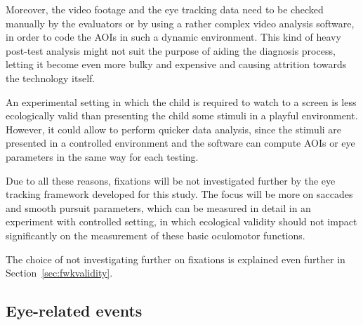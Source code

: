 Moreover, the video footage and the eye tracking data need to be checked manually by the evaluators or by using a rather complex video analysis software, in order to code the AOIs in such a dynamic environment. This kind of heavy post-test analysis might not suit the purpose of aiding the diagnosis process, letting it become even more bulky and expensive and causing attrition towards the technology itself.

An experimental setting in which the child is required to watch to a screen is less ecologically valid than presenting the child some stimuli in a playful environment. However, it could allow to perform quicker data analysis, since the stimuli are presented in a controlled environment and the software can compute AOIs or eye parameters in the same way for each testing.

Due to all these reasons, fixations will be not investigated further by the eye tracking framework developed for this study. The focus will be more on saccades and smooth pursuit parameters, which can be measured in detail in an experiment with controlled setting, in which ecological validity should not impact significantly on the measurement of these basic oculomotor functions.

The choice of not investigating further on fixations is explained even further in Section~\ref{sec:fwkvalidity}.



\subsection{Eye-related events}
\label{sec:eyerelatedevents}

\newline




